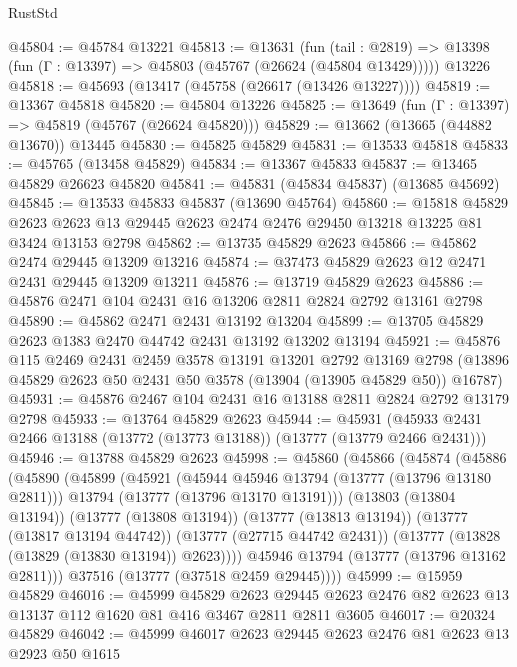 \begin{lexlean}{RustStd}
\begin{coremodule}
@45804 := @45784 @13221
@45813 := @13631
    (fun (tail : @2819) => @13398 (fun (Γ : @13397) => @45803 (@45767 (@26624 (@45804 @13429)))))
    @13226
@45818 := @45693 (@13417 (@45758 (@26617 (@13426 @13227))))
@45819 := @13367 @45818
@45820 := @45804 @13226
@45825 := @13649 (fun (Γ : @13397) => @45819 (@45767 (@26624 @45820)))
@45829 := @13662 (@13665 (@44882 @13670)) @13445
@45830 := @45825 @45829
@45831 := @13533 @45818
@45833 := @45765 (@13458 @45829)
@45834 := @13367 @45833
@45837 := @13465 @45829 @26623 @45820
@45841 := @45831 (@45834 @45837) (@13685 @45692)
@45845 := @13533 @45833 @45837 (@13690 @45764)
@45860 := @15818
    @45829
    @2623
    @2623
    @13
    @29445
    @2623
    @2474
    @2476
    @29450
    @13218
    @13225
    @81
    @3424
    @13153
    @2798
@45862 := @13735 @45829 @2623
@45866 := @45862 @2474 @29445 @13209 @13216
@45874 := @37473 @45829 @2623 @12 @2471 @2431 @29445 @13209 @13211
@45876 := @13719 @45829 @2623
@45886 := @45876 @2471 @104 @2431 @16 @13206 @2811 @2824 @2792 @13161 @2798
@45890 := @45862 @2471 @2431 @13192 @13204
@45899 := @13705 @45829 @2623 @1383 @2470 @44742 @2431 @13192 @13202 @13194
@45921 := @45876
    @115
    @2469
    @2431
    @2459
    @3578
    @13191
    @13201
    @2792
    @13169
    @2798
    (@13896 @45829 @2623 @50 @2431 @50 @3578 (@13904 (@13905 @45829 @50)) @16787)
@45931 := @45876 @2467 @104 @2431 @16 @13188 @2811 @2824 @2792 @13179 @2798
@45933 := @13764 @45829 @2623
@45944 := @45931 (@45933 @2431 @2466 @13188 (@13772 (@13773 @13188)) (@13777 (@13779 @2466 @2431)))
@45946 := @13788 @45829 @2623
@45998 := @45860
    (@45866
      (@45874
        (@45886
          (@45890
            (@45899
              (@45921
                (@45944 @45946 @13794 (@13777 (@13796 @13180 @2811)))
                @13794
                (@13777 (@13796 @13170 @13191)))
              (@13803 (@13804 @13194))
              (@13777 (@13808 @13194))
              (@13777 (@13813 @13194))
              (@13777 (@13817 @13194 @44742))
              (@13777 (@27715 @44742 @2431))
              (@13777 (@13828 (@13829 (@13830 @13194)) @2623))))
          @45946
          @13794
          (@13777 (@13796 @13162 @2811)))
        @37516
        (@13777 (@37518 @2459 @29445))))
@45999 := @15959 @45829
@46016 := @45999
    @45829
    @2623
    @29445
    @2623
    @2476
    @82
    @2623
    @13
    @13137
    @112
    @1620
    @81
    @416
    @3467
    @2811
    @2811
    @3605
@46017 := @20324 @45829
@46042 := @45999
    @46017
    @2623
    @29445
    @2623
    @2476
    @81
    @2623
    @13
    @2923
    @50
    @1615

\end{coremodule}
\end{lexlean}
